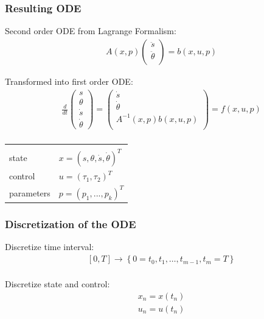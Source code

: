 \begin{frame}[c]
	\frametitle{Resulting ODE}
	
	Second order ODE from Lagrange Formalism:
	\begin{align*}
	  &A(x,p)
	  \begin{pmatrix} 
	    \ddot{s} \\ \ddot{\theta} \\
	  \end{pmatrix}
	  = b(x,u,p)
	\end{align*}
	
	Transformed into first order ODE:
	\begin{align*}
	  &\frac{d}{dt}
	  \begin{pmatrix}
	  s \\ \theta \\ \dot{s} \\ \dot{\theta}
	  \end{pmatrix}
	  =
	  \begin{pmatrix}
	    \dot{s} \\ \dot{\theta} \\ A^{-1}(x,p)b(x,u,p) \\
	  \end{pmatrix} 
	  = f(x,u,p) \\
	\end{align*}
	
	\vspace{-1.0cm}
	
	\begin{tabular}{ll}
	  & \\
	  state & $ x = (s,\theta,\dot{s},\dot{\theta})^T $ \\
	  control & $ u = (\tau_1,\tau_2)^T $ \\
	  parameters & $ p = (p_1,...,p_k)^T $ \\
	\end{tabular}
\end{frame}

\begin{frame}
	\frametitle{Discretization of the ODE}
	
	
	Discretize time interval:
	\begin{align*}
	  &[0,T] \rightarrow \left\{ 0=t_0, t_1, \dots, t_{m-1}, t_{m}=T 
\right\} \\
	\end{align*}
	
	Discretize state and control:
	\begin{align*}
	  &x_n = x(t_n) \\
	  &u_n = u(t_n) \\
	\end{align*}
	
\end{frame}

